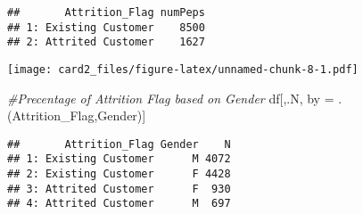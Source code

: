 \documentclass[]{article}
\newenvironment{Shaded}{\begin{snugshade}}{\end{snugshade}}
\newcommand{\CommentTok}[1]{\textcolor[rgb]{0.56,0.35,0.01}{\textit{#1}}}
\newcommand{\DataTypeTok}[1]{\textcolor[rgb]{0.13,0.29,0.53}{#1}}
\newcommand{\DecValTok}[1]{\textcolor[rgb]{0.00,0.00,0.81}{#1}}
\newcommand{\FloatTok}[1]{\textcolor[rgb]{0.00,0.00,0.81}{#1}}
\newcommand{\KeywordTok}[1]{\textcolor[rgb]{0.13,0.29,0.53}{\textbf{#1}}}
\newcommand{\NormalTok}[1]{#1}
\newcommand{\OperatorTok}[1]{\textcolor[rgb]{0.81,0.36,0.00}{\textbf{#1}}}
\newcommand{\StringTok}[1]{\textcolor[rgb]{0.31,0.60,0.02}{#1}}
\begin{document}
\begin{verbatim}
##       Attrition_Flag numPeps
## 1: Existing Customer    8500
## 2: Attrited Customer    1627
\end{verbatim}

\begin{Shaded}
\end{Shaded}

\texttt{[image: card2\_files/figure-latex/unnamed-chunk-8-1.pdf]}

\begin{Shaded}
\begin{Highlighting}[]
\CommentTok{#Precentage of Attrition Flag based on Gender }
\NormalTok{df[,.N, by =}\StringTok{ }\NormalTok{.(Attrition_Flag,Gender)]}
\end{Highlighting}
\end{Shaded}

\begin{verbatim}
##       Attrition_Flag Gender    N
## 1: Existing Customer      M 4072
## 2: Existing Customer      F 4428
## 3: Attrited Customer      F  930
## 4: Attrited Customer      M  697
\end{verbatim}
\end{document}
